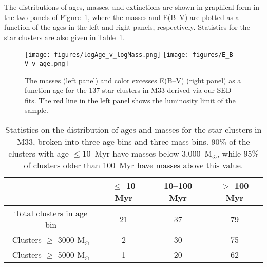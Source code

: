 \documentclass{aastex63}
\begin{document}
The distributions of ages, masses, and extinctions are shown in graphical form in the two panels of Figure~\ref{logAge_v_logMass}, where the masses and E(B--V) are plotted as a function of the ages in the left and right panels, respectively. Statistics for the star clusters are also given in Table~\ref{cl_mass_table}.

\begin{figure}[ht]
  \centering
 \texttt{[image: figures/logAge\_v\_logMass.png]}
 \texttt{[image: figures/E\_B-V\_v\_age.png]}
   \caption{The masses (left panel) and color excesses E(B--V) (right panel) as a function age for the 137 star clusters in M33 derived via our SED fits. The red line in the left panel shows  the luminosity limit of the sample.}
        \label{logAge_v_logMass}
\end{figure}

\begin{table}[ht]
\centering   
\begin{tabular}{@{}c|c|c|c@{}}
\toprule
                            & $\leq$ 10 Myr & 10--100 Myr & $>$ 100 Myr \\ \hline
Total clusters in age bin               & 21        & 37        & 79       \\
Clusters $\ge$ 3000 M$_{\odot}$     & 2         & 30        & 75         \\
Clusters $\ge$ 5000 M$_{\odot}$     & 1         & 20        & 62         \\
\hline
\end{tabular}
    \caption{Statistics on the distribution of ages and masses for the star clusters in M33, broken into  three age bins and three mass bins. 90\% of the clusters with age $\leq$10~Myr have masses below 3,000~M$_{\odot}$, while 95\% of clusters older than 100~Myr  have masses above this value.}
    \label{cl_mass_table}
\end{table}
\end{document}
